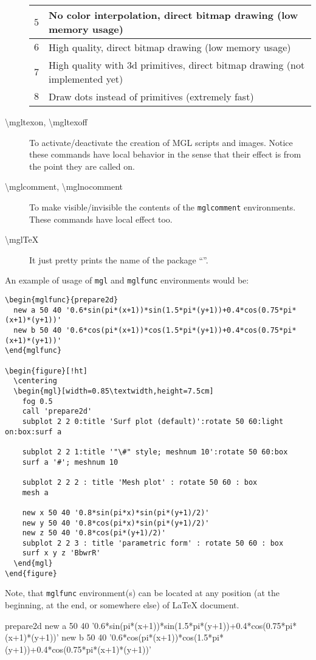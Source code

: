 \documentclass{article}
\begin{document}
\begin{description}
\begin{center}
\begin{tabular}{cl}
      \hline
      $5$ & No color interpolation, direct bitmap drawing (low memory usage)\\
      \hline
      $6$ & High quality, direct bitmap drawing (low memory usage)\\
      \hline
      $7$ & High quality with 3d primitives, direct bitmap drawing (not implemented yet)\\
      \hline
      $8$ & Draw dots instead of primitives (extremely fast)\\
      \hline
    \end{tabular}
  \end{center}
\item[\textbackslash{}mgltexon, \textbackslash{}mgltexoff]
  To activate/deactivate the creation of MGL scripts and images. Notice these commands have local behavior in the sense that their effect is from the point they are called on.
\item[\textbackslash{}mglcomment, \textbackslash{}mglnocomment]
  To make visible/invisible the contents of the \texttt{mglcomment} environments. These commands have local effect too.
\item[\textbackslash{}mglTeX]
	It just pretty prints the name of the package ``\mglTeX''.
\end{description}


An example of usage of \texttt{mgl} and \texttt{mglfunc} environments would be:
\begin{verbatim}
\begin{mglfunc}{prepare2d}
  new a 50 40 '0.6*sin(pi*(x+1))*sin(1.5*pi*(y+1))+0.4*cos(0.75*pi*(x+1)*(y+1))'
  new b 50 40 '0.6*cos(pi*(x+1))*cos(1.5*pi*(y+1))+0.4*cos(0.75*pi*(x+1)*(y+1))'
\end{mglfunc}

\begin{figure}[!ht]
  \centering
  \begin{mgl}[width=0.85\textwidth,height=7.5cm]
    fog 0.5
    call 'prepare2d'
    subplot 2 2 0:title 'Surf plot (default)':rotate 50 60:light on:box:surf a

    subplot 2 2 1:title '"\#" style; meshnum 10':rotate 50 60:box
    surf a '#'; meshnum 10

    subplot 2 2 2 : title 'Mesh plot' : rotate 50 60 : box
    mesh a

    new x 50 40 '0.8*sin(pi*x)*sin(pi*(y+1)/2)'
    new y 50 40 '0.8*cos(pi*x)*sin(pi*(y+1)/2)'
    new z 50 40 '0.8*cos(pi*(y+1)/2)'
    subplot 2 2 3 : title 'parametric form' : rotate 50 60 : box
    surf x y z 'BbwrR'
  \end{mgl}
\end{figure}
\end{verbatim}
Note, that \texttt{mglfunc} environment(s) can be located at any position (at the beginning, at the end, or somewhere else) of LaTeX document.
\begin{mglfunc}{prepare2d}
  new a 50 40 '0.6*sin(pi*(x+1))*sin(1.5*pi*(y+1))+0.4*cos(0.75*pi*(x+1)*(y+1))'
  new b 50 40 '0.6*cos(pi*(x+1))*cos(1.5*pi*(y+1))+0.4*cos(0.75*pi*(x+1)*(y+1))'
\end{mglfunc}
\end{document}
